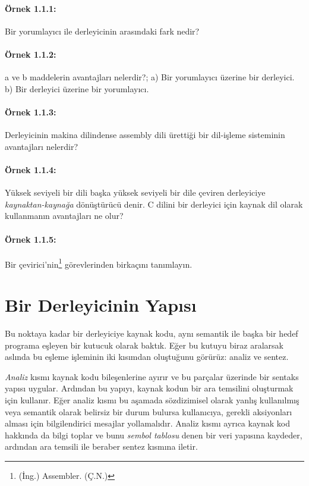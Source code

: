 \documentclass{book}
\begin{document}
\paragraph{Örnek 1.1.1:} Bir yorumlayıcı ile derleyicinin arasındaki fark nedir?

\paragraph{Örnek 1.1.2:}  a ve b maddelerin avantajları nelerdir?; a) Bir yorumlayıcı üzerine bir derleyici. b) Bir derleyici üzerine bir yorumlayıcı.

\paragraph{Örnek 1.1.3:} Derleyicinin makina dilindense assembly dili ürettiği bir dil-işleme sisteminin avantajları nelerdir?

\paragraph{Örnek 1.1.4:} Yüksek seviyeli bir dili başka yüksek seviyeli bir dile çeviren derleyiciye \textit{kaynaktan-kaynağa} dönüştürücü denir. C dilini bir derleyici için kaynak dil olarak kullanmanın avantajları ne olur?

\setcounter{footnote}{0}
\paragraph{Örnek 1.1.5:}  Bir çevirici'nin\footnote{(İng.) Assembler. (Ç.N.)} görevlerinden birkaçını tanımlayın.



\section{Bir Derleyicinin Yapısı}

Bu noktaya kadar bir derleyiciye kaynak kodu, aynı semantik ile başka bir hedef programa eşleyen bir kutucuk olarak baktık. Eğer bu kutuyu biraz aralarsak aslında bu eşleme işleminin iki kısımdan oluştuğunu görürüz: analiz ve sentez.

\textit{Analiz} kısmı kaynak kodu bileşenlerine ayırır ve bu parçalar üzerinde bir sentaks yapısı uygular. Ardından bu yapıyı, kaynak kodun bir ara temsilini oluşturmak için kullanır. Eğer analiz kısmı bu aşamada sözdizimisel olarak yanlış kullanılmış veya semantik olarak belirsiz bir durum bulursa kullanıcıya, gerekli aksiyonları alması için bilgilendirici mesajlar yollamalıdır. Analiz kısmı ayrıca kaynak kod hakkında da bilgi toplar ve bunu \textit{sembol tablosu} denen bir veri yapısına kaydeder, ardından ara temsili ile beraber sentez kısmına iletir.
\end{document}
